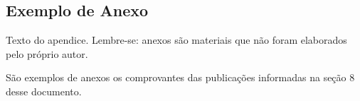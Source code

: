 

\begin{anexosenv}
	
	
	\chapter{Exemplo de Anexo}
	Texto do apendice. Lembre-se: anexos são materiais que não foram elaborados pelo próprio autor. 
  
  São exemplos de anexos os comprovantes das publicações informadas na seção 8 desse documento.
		
\end{anexosenv}